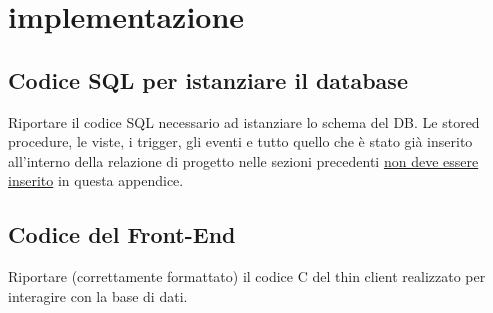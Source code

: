 \section{implementazione}

\subsection*{Codice SQL per istanziare il database}

\begin{templateblock}
    Riportare il codice SQL necessario ad istanziare lo schema del DB.
    Le stored procedure, le viste, i trigger, gli eventi e tutto quello che
    è stato già inserito all’interno della relazione di progetto nelle sezioni
    precedenti \underline{non deve essere inserito} in questa appendice.
\end{templateblock}

\subsection*{Codice del Front-End}

\begin{templateblock}
    Riportare (correttamente formattato) il codice C del thin client realizzato
    per interagire con la base di dati.
\end{templateblock}
